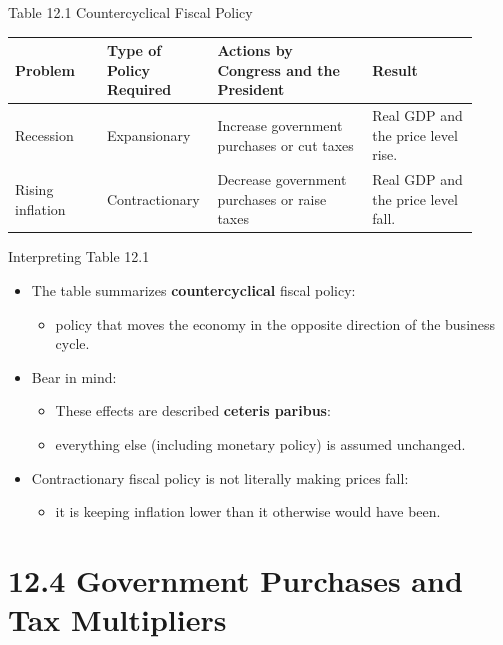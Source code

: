 \documentclass[aspectratio=169]{beamer}
\begin{document}
\begin{frame}{Table 12.1 Countercyclical Fiscal Policy}
\transfade
\begin{center}
\small
\begin{tabular}{p{0.19\linewidth} p{0.19\linewidth} p{0.32\linewidth} p{0.22\linewidth}}
\toprule
\textbf{Problem} &
\textbf{Type of Policy Required} &
\textbf{Actions by Congress and the President} &
\textbf{Result} \\
\midrule
Recession &
Expansionary &
Increase government purchases or cut taxes &
Real GDP and the price level rise. \\
Rising inflation &
Contractionary &
Decrease government purchases or raise taxes &
Real GDP and the price level fall. \\
\bottomrule
\end{tabular}
\end{center}
\end{frame}


\begin{frame}{Interpreting Table 12.1}
\transfade
\begin{itemize}
  \item The table summarizes \textbf{countercyclical} fiscal policy:
  \begin{itemize}
    \item policy that moves the economy in the opposite direction of the business cycle.
  \end{itemize}
  \item Bear in mind:
  \begin{itemize}
    \item These effects are described \textbf{ceteris paribus}:
    \item everything else (including monetary policy) is assumed unchanged.
  \end{itemize}
  \item Contractionary fiscal policy is not literally making prices fall:
  \begin{itemize}
    \item it is keeping inflation \alert{lower than it otherwise would have been}.
  \end{itemize}
\end{itemize}
\end{frame}

\section{12.4 Government Purchases and Tax Multipliers}
\end{document}
